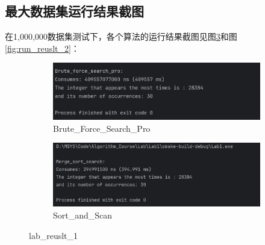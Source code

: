 \documentclass[UTF8,12pt,a4paper]{ctexart}
\begin{document}
\subsection{最大数据集运行结果截图}
在1,000,000数据集测试下，各个算法的运行结果截图见图\ref{fig:run_reuslt_1}和图\ref{fig:run_reuslt_2}：
\begin{figure}[htbp]
    \centering
    \begin{subfigure}[b]{0.45\textwidth} %
        \centering
        \includegraphics[width=\textwidth]{figures/max_brute_force.png} %
        \caption{Brute\_Force\_Search\_Pro}
        \label{fig:brute_force_search_pro}
    \end{subfigure}
    \hfill %
    \begin{subfigure}[b]{0.45\textwidth}
        \centering
        \includegraphics[width=\textwidth]{figures/sort_and_scan.png} %
        \caption{Sort\_and\_Scan}
        \label{fig:sort_and_scan}
    \end{subfigure}
    \caption{lab\_reuslt\_1}
    \label{fig:run_reuslt_1}
\end{figure}
\end{document}
